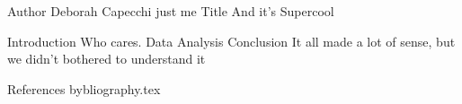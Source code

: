 Author 	Deborah Capecchi just me
Title	And it's Supercool



Introduction Who cares.
Data
Analysis
Conclusion
It all made a lot of sense, but we didn't bothered to understand it

References
bybliography.tex
